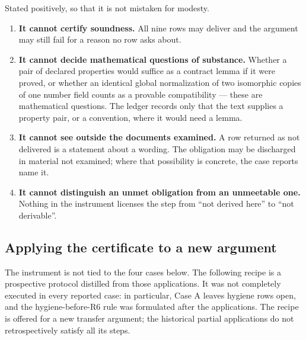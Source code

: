 \documentclass[11pt,a4paper]{article}
\theoremstyle{definition}
\begin{document}
Stated positively, so that it is not mistaken for modesty.

\begin{enumerate}
\item \textbf{It cannot certify soundness.} All nine rows may deliver and the
  argument may still fail for a reason no row asks about.
\item \textbf{It cannot decide mathematical questions of substance.} Whether a
  pair of declared properties would suffice as a contract lemma if it were
  proved, or whether an identical global normalization of two isomorphic copies
  of one number field counts as a provable compatibility --- these are
  mathematical questions. The ledger records only that the text supplies a
  property pair, or a convention, where it would need a lemma.
\item \textbf{It cannot see outside the documents examined.} A row returned as
  not delivered is a statement about a wording. The obligation may be discharged
  in material not examined; where that possibility is concrete, the case reports
  name it.
\item \textbf{It cannot distinguish an unmet obligation from an unmeetable one.}
  Nothing in the instrument licenses the step from ``not derived here'' to ``not
  derivable''.
\end{enumerate}

\subsection{Applying the certificate to a new argument}
\label{sec:recipe}

The instrument is not tied to the four cases below. The following recipe is a
prospective protocol distilled from those applications. It was not completely
executed in every reported case: in particular, Case A leaves hygiene rows open,
and the hygiene-before-R6 rule was formulated after the applications. The recipe
is offered for a new transfer argument; the historical partial applications do
not retrospectively satisfy all its steps.
\end{document}
